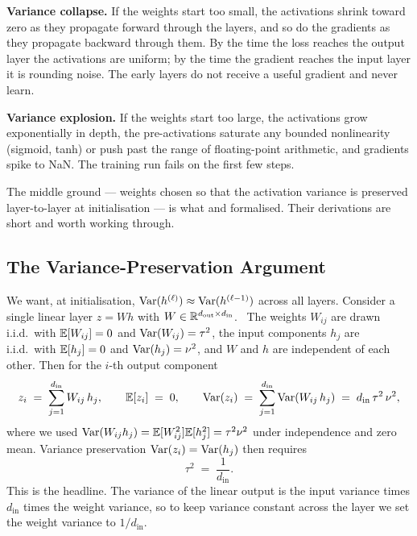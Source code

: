 \textbf{Variance collapse.} If the weights start too small, the
activations shrink toward zero as they propagate forward through
the layers, and so do the gradients as they propagate backward
through them. By the time the loss reaches the output layer the
activations are uniform; by the time the gradient reaches the
input layer it is rounding noise. The early layers do not
receive a useful gradient and never learn.

\textbf{Variance explosion.} If the weights start too large, the
activations grow exponentially in depth, the pre-activations
saturate any bounded nonlinearity (sigmoid, tanh) or push past
the range of floating-point arithmetic, and gradients spike to
NaN. The training run fails on the first few steps.

The middle ground --- weights chosen so that the
activation variance is preserved layer-to-layer at initialisation
--- is what \citet{glorot2010understanding} and
\citet{he2015delving} formalised. Their derivations are short and
worth working through.

\subsection{The Variance-Preservation Argument}

We want, at initialisation, $\mathrm{Var}(h^{(\ell)}) \approx
\mathrm{Var}(h^{(\ell-1)})$ across all layers. Consider a single linear
layer $z = W h$ with $W \in \mathbb{R}^{d_{\mathrm{out}} \times
d_{\mathrm{in}}}$. \Assum\ The weights $W_{ij}$ are drawn i.i.d.\
with $\mathbb{E}[W_{ij}] = 0$ and $\mathrm{Var}(W_{ij}) = \tau^2$, the input
components $h_j$ are i.i.d.\ with $\mathbb{E}[h_j] = 0$ and
$\mathrm{Var}(h_j) = \nu^2$, and $W$ and $h$ are independent of each
other. Then for the $i$-th output component
\[
  z_i \;=\; \sum_{j=1}^{d_{\mathrm{in}}} W_{ij}\, h_j,
  \qquad
  \mathbb{E}[z_i] \;=\; 0,
  \qquad
  \mathrm{Var}(z_i)
  \;=\; \sum_{j=1}^{d_{\mathrm{in}}} \mathrm{Var}(W_{ij}\, h_j)
  \;=\; d_{\mathrm{in}}\, \tau^2\, \nu^2,
\]
where we used $\mathrm{Var}(W_{ij} h_j) = \mathbb{E}[W_{ij}^2]\mathbb{E}[h_j^2] = \tau^2
\nu^2$ under independence and zero mean. Variance preservation
$\mathrm{Var}(z_i) = \mathrm{Var}(h_j)$ then requires
\begin{equation}
  \tau^2 \;=\; \frac{1}{d_{\mathrm{in}}}.
  \label{eq:nn-var-preserve}
\end{equation}
This is the headline. The variance of the linear output is the
input variance times $d_{\mathrm{in}}$ times the weight variance,
so to keep variance constant across the layer we set the weight
variance to $1/d_{\mathrm{in}}$.

